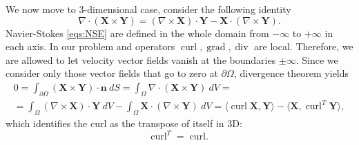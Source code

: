 \documentclass{article}
\numberwithin{equation}{section}
\begin{document}
We now move to 3-dimensional case, consider the following identity
\begin{equation}
\nabla \cdot(\boldsymbol{X} \times \boldsymbol{Y})=(\nabla \times \boldsymbol{X}) \cdot \boldsymbol{Y}-\boldsymbol{X} \cdot(\nabla \times \boldsymbol{Y}).
\end{equation}
Navier-Stokes \cref{eqs:NSE} are defined in the whole domain from $-\infty$ to $+\infty$ in each axis. 
	In our problem and operators $\operatorname{curl},\operatorname{grad},\operatorname{div}$ are local. 
	Therefore, we are allowed to let velocity vector fields vanish at the boundaries $\pm\infty$.
	Since we consider only those vector fields that go to zero at $\partial \Omega$, divergence theorem yields
\begin{multline}
	0
	=	\int_{\partial \Omega}(\boldsymbol{X} \times \boldsymbol{Y}) \cdot \boldsymbol{n}\ dS
	=\int_{\Omega} \nabla \cdot(\boldsymbol{X} \times \boldsymbol{Y})\ dV=\\
	=\int_{\Omega} \left(\nabla \times \boldsymbol{X}\right)\cdot \boldsymbol{Y}\ dV
		-\int_{\Omega} \boldsymbol{X} \cdot \left(\nabla \times \boldsymbol{Y}\right)\ dV
	=\langle \operatorname{curl}\boldsymbol{X},\boldsymbol{Y}\rangle-\langle \boldsymbol{X},\operatorname{curl}^T\boldsymbol{Y}\rangle ,
\end{multline}
which identifies the curl as the transpose of itself in 3D:
\begin{equation}\label{eqn:curl-curl-orth}
\operatorname{curl}^T=\operatorname{curl.}	
\end{equation}


\pagebreak
\end{document}
